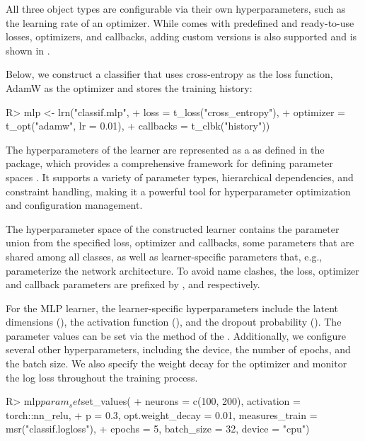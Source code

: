 \documentclass[article]{jss}
\theoremstyle{definition}
\begin{document}
All three object types are configurable via their own hyperparameters, such as the learning rate of an optimizer.
While  comes with predefined and ready-to-use losses, optimizers, and callbacks, adding custom versions is also supported and is shown in .

Below, we construct a  classifier that uses cross-entropy as the loss function, AdamW as the optimizer \citep{ref-loshchilov2017decoupled} and stores the training history:

\begin{CodeInput}
R> mlp <- lrn("classif.mlp",
+   loss = t_loss("cross_entropy"),
+   optimizer = t_opt("adamw", lr = 0.01),
+   callbacks = t_clbk("history"))
\end{CodeInput}

The hyperparameters of the learner are represented as a  as defined in the  package, which provides a comprehensive framework for defining parameter spaces \citep{ref-paradox2024}.
It supports a variety of parameter types, hierarchical dependencies, and constraint handling, making it a powerful tool for hyperparameter optimization and configuration management.

The hyperparameter space of the constructed learner contains the parameter union from the specified loss, optimizer and callbacks, some parameters that are shared among all  classes, as well as learner-specific parameters that, e.g., parameterize the network architecture.
To avoid name clashes, the loss, optimizer and callback parameters are prefixed by ,   and  respectively.

For the MLP learner, the learner-specific hyperparameters include the latent dimensions (), the activation function (), and the dropout probability ().
The parameter values can be set via the  method of the .
Additionally, we configure several other hyperparameters, including the device, the number of epochs, and the batch size.
We also specify the weight decay for the optimizer and monitor the log loss throughout the training process.

\begin{CodeInput}
R> mlp$param_set$set_values(
+    neurons = c(100, 200), activation = torch::nn_relu,
+    p = 0.3, opt.weight_decay = 0.01, measures_train = msr("classif.logloss"),
+    epochs = 5, batch_size = 32, device = "cpu")
\end{CodeInput}
\end{document}
